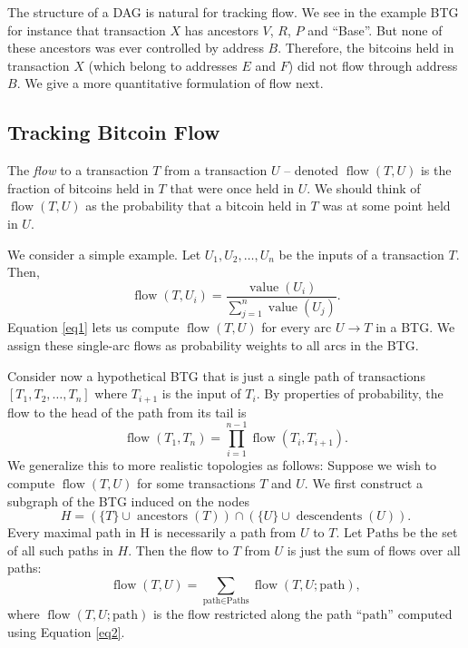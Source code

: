 \documentclass[letterpaper, 10 pt, conference]{ieeeconf}  %
\newcommand{\flow}{\operatorname{flow}}
\newcommand{\txvalue}{\operatorname{value}}
\begin{document}
The structure of a DAG is natural for tracking flow. We see in the example BTG for instance that transaction $X$ has ancestors $V$, $R$, $P$ and ``Base''. But none of these ancestors was ever controlled by address $B$. Therefore, the bitcoins held in transaction $X$ (which belong to addresses $E$ and $F$) did not flow through address $B$. We give a more quantitative formulation of flow next.


\subsection{Tracking Bitcoin Flow}

The \emph{flow} to a transaction $T$ from a transaction $U$ -- denoted $\flow(T,U)$ is the fraction of bitcoins held in $T$ that were once held in $U$. We should think of $\flow(T,U)$ as the probability that a bitcoin held in $T$ was at some point held in $U$.

We consider a simple example. Let $U_1,U_2,\ldots,U_n$ be the inputs of a transaction $T$. Then,
\begin{equation} \label{eq1}
\flow(T,U_i) = \frac{\txvalue(U_i)}{\sum_{j=1}^n \txvalue(U_j)}.
\end{equation}
Equation \ref{eq1} lets us compute $\flow(T,U)$ for every arc $U\rightarrow T$ in a BTG. We assign these single-arc flows as probability weights to all arcs in the BTG.

Consider now a hypothetical BTG that is just a single path of transactions $[T_1,T_2,\ldots,T_n]$ where $T_{i+1}$ is the input of $T_i$. By properties of probability, the flow to the head of the path from its tail is
\begin{equation} \label{eq2}
\flow(T_1, T_n) = \prod_{i=1}^{n-1} \flow(T_i, T_{i+1}).
\end{equation}
We generalize this to more realistic topologies as follows: Suppose we wish to compute $\flow(T, U)$ for some transactions $T$ and $U$. We first construct a subgraph of the BTG induced on the nodes
\[ H = (\{T\}\cup\operatorname{ancestors}(T))\cap (\{U\}\cup\operatorname{descendents}(U)). \]
Every maximal path in H is necessarily a path from $U$ to $T$. Let $\mbox{Paths}$ be the set of all such paths in $H$. Then the flow to $T$ from $U$ is just the sum of flows over all paths:
\begin{equation} \label{eq3}
\flow(T, U) = \sum_{\mbox{path}\in\mbox{Paths}}\flow(T, U;\mbox{path}),
\end{equation}
where $\flow(T, U;\mbox{path})$ is the flow restricted along the path ``$\mbox{path}$'' computed using Equation \ref{eq2}.
\end{document}
